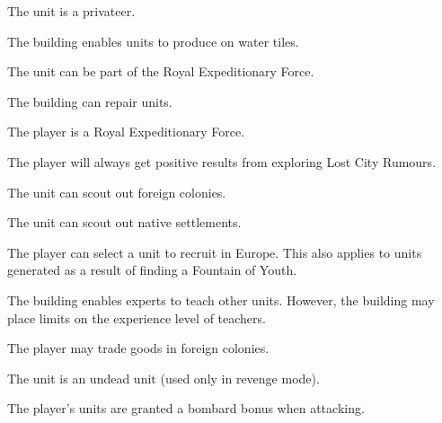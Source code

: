 \documentclass[12pt]{book}
\begin{document}
The unit is a privateer.

\affectsBuilding

The building enables units to produce on water tiles.

\affectsUnit

The unit can be part of the Royal Expeditionary Force.

\affectsBuilding

The building can repair units.

\affectsPlayer

The player is a Royal Expeditionary Force.

\affectsPlayer

The player will always get positive results from exploring Lost City
Rumours.

\affectsUnit

The unit can scout out foreign colonies.

\affectsUnit

The unit can scout out native settlements.

\affectsPlayer

The player can select a unit to recruit in Europe. This also applies
to units generated as a result of finding a Fountain of Youth.

\affectsBuilding

The building enables experts to teach other units. However, the
building may place limits on the experience level of teachers.

\affectsPlayer

The player may trade goods in foreign colonies.

\affectsUnit

The unit is an undead unit (used only in revenge mode).





\affectsPlayer

The player's units are granted a bombard bonus when attacking.

\affectsPlayer
\end{document}
